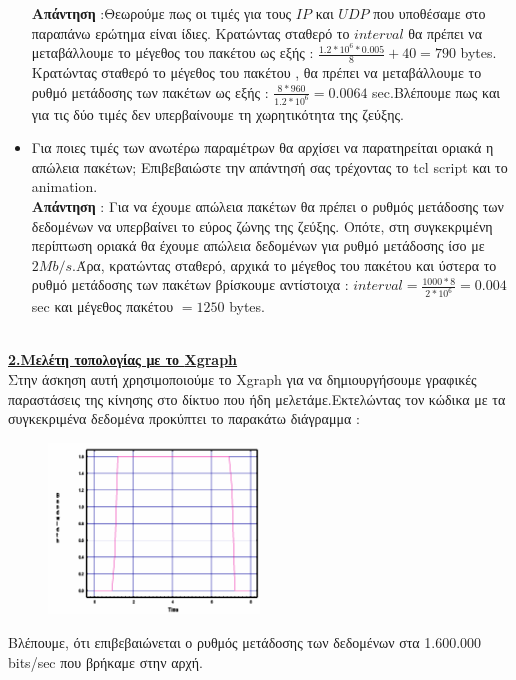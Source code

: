 \documentclass{article}%
\begin{document}
\begin{itemize}
\textbf{Απάντηση} :Θεωρούμε πως οι τιμές για τους $IP$ και $UDP$ που υποθέσαμε στο παραπάνω ερώτημα είναι ίδιες. Κρατώντας σταθερό το $interval$ θα πρέπει να μεταβάλλουμε το μέγεθος του πακέτου ως εξής : $\frac{1.2*10^6*0.005}{8}+40 = 790 $ \textlatin{bytes}. Κρατώντας σταθερό το μέγεθος του πακέτου , θα πρέπει να μεταβάλλουμε το ρυθμό μετάδοσης των πακέτων ως εξής : $\frac{8*960}{1.2*10^6}=0.0064$ \textlatin{sec}.Βλέπουμε πως και για τις δύο τιμές δεν υπερβαίνουμε τη χωρητικότητα της ζεύξης.
\item Για ποιες τιμές των ανωτέρω παραμέτρων θα αρχίσει να παρατηρείται οριακά η απώλεια πακέτων;
Επιβεβαιώστε την απάντησή σας τρέχοντας το \textlatin{tcl script} και το \textlatin{animation}.\\ 
\textbf{Απάντηση} : Για να έχουμε απώλεια πακέτων θα πρέπει ο ρυθμός μετάδοσης των δεδομένων να υπερβαίνει το εύρος ζώνης της ζεύξης. Οπότε, στη συγκεκριμένη περίπτωση οριακά θα έχουμε απώλεια δεδομένων για ρυθμό μετάδοσης ίσο με $2 Mb/s$.Άρα, κρατώντας σταθερό, αρχικά το μέγεθος του πακέτου και ύστερα το ρυθμό μετάδοσης των πακέτων βρίσκουμε αντίστοιχα : $interval= \frac{1000*8}{2*10^6}=0.004 $ \textlatin{sec} και μέγεθος πακέτου $=1250$ \textlatin{bytes}.\\\\

\end{itemize}
\textbf{{\underline{2.Μελέτη τοπολογίας με το \textlatin{Xgraph} }}}  \\Στην άσκηση αυτή χρησιμοποιούμε το \textlatin{Xgraph} για να δημιουργήσουμε γραφικές παραστάσεις της κίνησης στο δίκτυο που ήδη μελετάμε.Εκτελώντας τον κώδικα με τα συγκεκριμένα δεδομένα προκύπτει το παρακάτω διάγραμμα :
\begin{figure}[htbp]
	\centering
		\includegraphics[width=0.50\textwidth]{3.png}
\end{figure}
Βλέπουμε, ότι επιβεβαιώνεται ο ρυθμός μετάδοσης των δεδομένων στα 1.600.000 \textlatin{bits/sec} που βρήκαμε στην αρχή.\\\\
\end{document}
